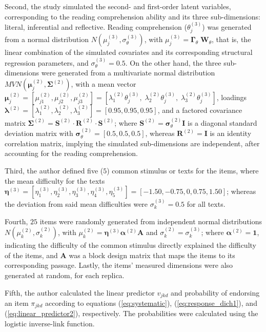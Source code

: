 Second, the study simulated the second- and first-order latent variables, corresponding to the reading comprehension ability and its three sub-dimensions: literal, inferential and reflective. Reading comprehension ($\theta^{(3)}_{j}$) was generated from a normal distribution $N( \mu^{(3)}_{j}, \sigma^{(3)}_{\theta} )$, with $\mu^{(3)}_{j} = \pmb{\Gamma}_{\theta} \; \mathbf{W}_{\theta}$, that is, the linear combination of the simulated covariates and its corresponding structural regression parameters, and $\sigma^{(3)}_{\theta}=0.5$. On the other hand, the three sub-dimensions were generated from a multivariate normal distribution $MVN( \pmb{\mu}^{(2)}_{j} , \pmb{\Sigma}^{(2)})$, with a mean vector $\pmb{\mu}^{(2)}_{j} = [\mu^{(2)}_{j1}, \mu^{(2)}_{j2}, \mu^{(2)}_{j3}] = [\lambda^{(2)}_{1} \theta^{(3)}_{j}, \; \lambda^{(2)}_{2} \theta^{(3)}_{j}, \; \lambda^{(2)}_{3} \theta^{(3)}_{j} ]$, loadings $\pmb{\lambda}^{(2)} = [\lambda^{(2)}_{1}, \lambda^{(2)}_{2}, \lambda^{(2)}_{3}] = [0.95, 0.95, 0.95]$, and a factored covariance matrix $\pmb{\Sigma}^{(2)} = \mathbf{S}^{(2)} \cdot \mathbf{R}^{(2)} \cdot \mathbf{S}^{(2)}$; where $\mathbf{S}^{(2)} = \pmb{\sigma}^{(2)}_{\theta} \mathbf{I}$ is a diagonal standard deviation matrix with $\pmb{\sigma}^{(2)}_{\theta} = [0.5, 0.5, 0.5]$, whereas $\mathbf{R}^{(2)} = \mathbf{I}$ is an identity correlation matrix, implying the simulated sub-dimensions are independent, after accounting for the reading comprehension.

Third, the author defined five ($5$) common stimulus or texts for the items, where the mean difficulty for the texts $\pmb{\eta}^{(3)} = [\eta^{(3)}_{1}, \eta^{(3)}_{2}, \eta^{(3)}_{3}, \eta^{(3)}_{4}, \eta^{(3)}_{5}] = [-1.50, -0.75, 0, 0.75, 1.50]$; whereas the deviation from said mean difficulties were $\sigma^{(3)}_{k} = 0.5$ for all texts. 

Fourth, $25$ items were randomly generated from independent normal distributions $N( \mu^{(2)}_{k}, \sigma^{(2)}_{k} ) $, with $\mu^{(2)}_{k} = \pmb{\eta}^{(3)} \pmb{\alpha}^{(2)} \mathbf{A}$ and $\sigma^{(2)}_{k} = \sigma^{(3)}_{k}$; where $\pmb{\alpha}^{(2)} = \mathbf{1}$, indicating the difficulty of the common stimulus directly explained the difficulty of the items, and $\mathbf{A}$ was a block design matrix that maps the items to its corresponding passage. Lastly, the items' measured dimensions were also generated at random, for each replica.

Fifth, the author calculated the linear predictor $v_{jkd}$ and probability of endorsing an item $\pi_{jkd}$ according to equations (\ref{eq:systematic}), (\ref{eq:response_dich1}), and (\ref{eq:linear_predictor2}), respectively. The probabilities were calculated using the logistic inverse-link function.
	
